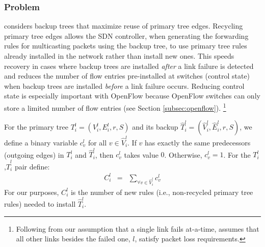 \subsubsection{\mcn Problem}
\label{subsubsec:min-control}


\mc considers backup trees that maximize reuse of primary tree edges.  Recycling primary tree edges allows the SDN controller, when generating the forwarding rules for multicasting 
packets using the backup tree, to use primary tree rules already installed in the network rather than install new ones.
This speeds recovery in cases where backup trees are installed \emph{after} a link failure is detected and reduces the number of flow entries pre-installed at switches (control state) 
when backup trees are installed \emph{before} a link failure occurs.  
Reducing control state is especially important with OpenFlow because OpenFlow switches can only store a limited number of flow entries (see Section \ref{subsec:openflow}).
\footnote{Following from our assumption that a single link fails at-a-time, \mc assumes that all other links besides the failed one, $l$, satisfy packet loss requirements. }

For the primary tree $T^l_i = (V^l_i,E^l_i,r,S)$ and its backup $\hat{T}^l_i=(\hat{V}^l_i,\hat{E}^l_i,r,S)$, we define a binary variable $c_v^l$ for all $v \in \hat{V}_i^l$. 
If $v$ has exactly the same predecessors (outgoing edges) in $T^l_i$ and $\hat{T}^l_i$, then $c_v^l$ takes value $0$.  Otherwise, $c_v^l=1$.  
For the $T^l_i$,$\hat{T}^l_i$ pair define:
\begin{eqnarray}
\label{eqn:control-overhead}
 C_i^l &=&  \sum_{\forall v \in \hat{V}_i^l} c_v^l 
\end{eqnarray}
For our purposes, $C_i^l$ is the number of new rules (i.e., non-recycled primary tree rules) needed to install $\hat{T}^l_i$.

